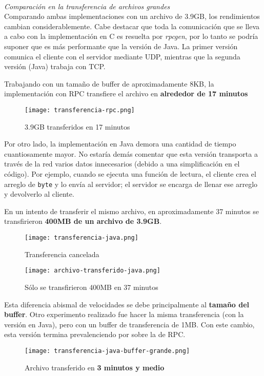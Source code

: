 ~\\
\emph{Comparación en la transferencia de archivos grandes} 
~\\

Comparando ambas implementaciones con un archivo de 3.9GB, los rendimientos cambian considerablemente. Cabe destacar que toda la comunicación que se lleva a cabo con la implementación en C es resuelta por \emph{rpcgen}, por lo tanto se podría suponer que es más performante que la versión de Java. La primer versión comunica el cliente con el servidor mediante UDP, mientras que la segunda versión (Java) trabaja con TCP.

Trabajando con un tamaño de buffer de aproximadamente 8KB, la implementación con RPC transfiere el archivo en \textbf{alrededor de 17 minutos} 

\begin{figure}[h]
    \centering
    \texttt{[image: transferencia-rpc.png]}
    \caption{3.9GB transferidos en 17 minutos}
\end{figure}

Por otro lado, la implementación en Java demora una cantidad de tiempo cuantiosamente mayor. No estaría demás comentar que esta versión transporta a través de la red varios datos innecesarios (debido a una simplificación en el código). Por ejemplo, cuando se ejecuta una función de lectura, el cliente crea el arreglo de \texttt{byte} y lo envía al servidor; el servidor se encarga de llenar ese arreglo y devolverlo al cliente. 

En un intento de transferir el mismo archivo, en aproximadamente 37 minutos se transfirieron \textbf{400MB de un archivo de 3.9GB}.

\begin{figure}[h]
    \centering
    \texttt{[image: transferencia-java.png]}
    \caption{Transferencia cancelada}
\end{figure}
\begin{figure}[h]
    \centering
    \texttt{[image: archivo-transferido-java.png]}
    \caption{Sólo se transfirieron 400MB en 37 minutos}
\end{figure}

Esta diferencia abismal de velocidades se debe principalmente al \textbf{tamaño del buffer}. Otro experimento realizado fue hacer la misma transferencia (con la versión en Java), pero con un buffer de transferencia de 1MB. Con este cambio, esta versión termina prevalenciendo por sobre la de RPC.

\begin{figure}[H]
    \centering
    \texttt{[image: transferencia-java-buffer-grande.png]}
    \caption{Archivo transferido en \textbf{3 minutos y medio} }
\end{figure}

